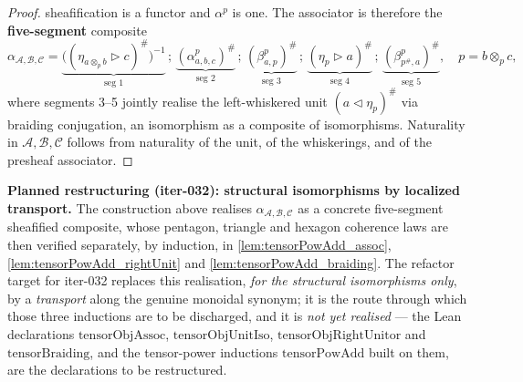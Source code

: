 \begin{proof}
  sheafification is a functor and \(\alpha^p\) is one. The associator is therefore
  the \textbf{five-segment} composite
  \[
    \alpha_{\mathcal{A},\mathcal{B},\mathcal{C}}
      = \underbrace{\bigl((\eta_{a \otimes_p b} \rhd c)^{\#}\bigr)^{-1}}_{\text{seg }1}
        \,;\, \underbrace{(\alpha^p_{a,b,c})^{\#}}_{\text{seg }2}
        \,;\, \underbrace{(\beta^p_{a,p})^{\#}}_{\text{seg }3}
        \,;\, \underbrace{(\eta_{p} \rhd a)^{\#}}_{\text{seg }4}
        \,;\, \underbrace{(\beta^p_{p^{\#},a})^{\#}}_{\text{seg }5},
    \quad p = b \otimes_p c,
  \]
  where segments 3--5 jointly realise the left-whiskered unit
  \((a \lhd \eta_{p})^{\#}\) via braiding conjugation,
  an isomorphism as a composite of isomorphisms. Naturality in
  \(\mathcal{A}, \mathcal{B}, \mathcal{C}\) follows from naturality of the unit,
  of the whiskerings, and of the presheaf associator.
\end{proof}

\medskip
\noindent\textbf{Planned restructuring (iter-032): structural isomorphisms by
localized transport.}
The construction above realises \(\alpha_{\mathcal{A},\mathcal{B},\mathcal{C}}\)
as a concrete five-segment sheafified composite, whose pentagon, triangle and
hexagon coherence laws are then verified separately, by induction, in
\cref{lem:tensorPowAdd_assoc}, \cref{lem:tensorPowAdd_rightUnit} and
\cref{lem:tensorPowAdd_braiding}. The refactor target for iter-032 replaces this
realisation, \emph{for the structural isomorphisms only}, by a \emph{transport}
along the genuine monoidal synonym; it is the route through which those three
inductions are to be discharged, and it is \emph{not yet realised} --- the Lean
declarations \(\mathrm{tensorObjAssoc}\), \(\mathrm{tensorObjUnitIso}\),
\(\mathrm{tensorObjRightUnitor}\) and \(\mathrm{tensorBraiding}\), and the
tensor-power inductions \(\mathrm{tensorPowAdd}\) built on them, are the
declarations to be restructured.

